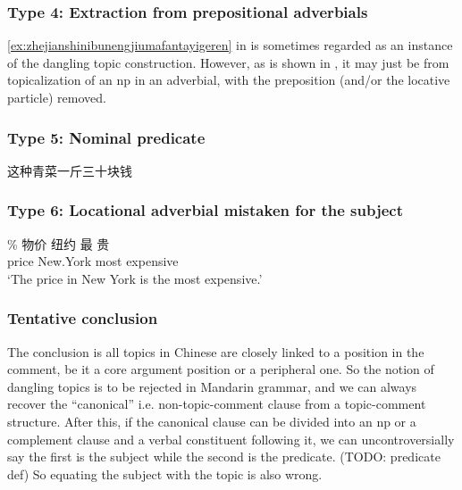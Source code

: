 \documentclass[UTF8, a4paper, oneside, scheme=plain, 12pt]{ctexrep}
\newcommand{\translate}[1]{`#1'}
\begin{document}
\subsubsection{Type 4: Extraction from prepositional adverbials}

\eqref{ex:zhejianshinibunengjiumafantayigeren} in  
is sometimes regarded as an instance of the dangling topic construction.
However, as is shown in ,
it may just be from topicalization of an \acs{np} in an adverbial,
with the preposition (and/or the locative particle) removed.

\subsubsection{Type 5: Nominal predicate}

\begin{exe}
    \ex 这种青菜一斤三十块钱
\end{exe}

\subsubsection{Type 6: Locational adverbial mistaken for the subject}

\begin{exe}
    \ex \gll \% 物价 纽约 最 贵  \\
    {} price New.York most expensive \\
    \glt \translate{The price in New York is the most expensive.}
\end{exe}

\subsubsection{Tentative conclusion}

The conclusion is all topics in Chinese are closely linked to a position in the comment,
be it a core argument position or a peripheral one.
So the notion of dangling topics is to be rejected in Mandarin grammar,
and we can always recover the ``canonical'' i.e. non-topic-comment clause
from a topic-comment structure.
After this, if the canonical clause can be divided into an \acs{np}
or a complement clause and a verbal constituent following it,
we can uncontroversially say the first is the subject while the second is the predicate. (TODO: predicate def)
So equating the subject with the topic is also wrong.
\end{document}
